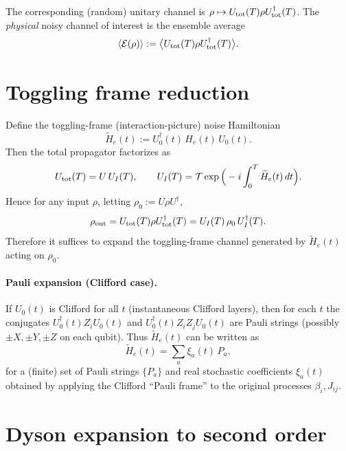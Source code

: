 \documentclass[11pt]{article}
\newcommand{\cE}{\mathcal{E}}
\begin{document}
The corresponding (random) unitary channel is $\rho\mapsto U_{\rm tot}(T)\rho U_{\rm tot}^\dagger(T)$. The \emph{physical} noisy channel of interest is the ensemble average
\begin{equation}
\langle \cE(\rho)\rangle := \big\langle U_{\rm tot}(T)\rho U_{\rm tot}^\dagger(T)\big\rangle.
\end{equation}

\section{Toggling frame reduction}

Define the toggling-frame (interaction-picture) noise Hamiltonian
\begin{equation}
\widetilde H_e(t):=U_0^\dagger(t)\,H_e(t)\,U_0(t).
\label{eq:Ht}
\end{equation}
Then the total propagator factorizes as
\begin{equation}
U_{\rm tot}(T)=U\,U_I(T),
\qquad
U_I(T)=\mathcal{T}\exp\Big(-i\int_0^T \widetilde H_e(t)\,dt\Big).
\label{eq:UI}
\end{equation}
Hence for any input $\rho$, letting $\rho_0:=U\rho U^\dagger$,
\begin{equation}
\rho_{\rm out}
=
U_{\rm tot}(T)\rho U_{\rm tot}^\dagger(T)
=
U_I(T)\,\rho_0\,U_I^\dagger(T).
\label{eq:rhoout_toggle}
\end{equation}
Therefore it suffices to expand the toggling-frame channel generated by $\widetilde H_e(t)$ acting on $\rho_0$.

\paragraph{Pauli expansion (Clifford case).}
If $U_0(t)$ is Clifford for all $t$ (instantaneous Clifford layers), then for each $t$ the conjugates
$U_0^\dagger(t)Z_iU_0(t)$ and $U_0^\dagger(t)Z_iZ_jU_0(t)$ are Pauli strings (possibly $\pm X,\pm Y,\pm Z$ on each qubit).
Thus $\widetilde H_e(t)$ can be written as
\begin{equation}
\widetilde H_e(t)=\sum_a \xi_a(t)\,P_a,
\label{eq:Ht_pauli}
\end{equation}
for a (finite) set of Pauli strings $\{P_a\}$ and real stochastic coefficients $\xi_a(t)$ obtained by applying the Clifford ``Pauli frame'' to the original processes $\beta_i,J_{ij}$.

\section{Dyson expansion to second order}
\end{document}
